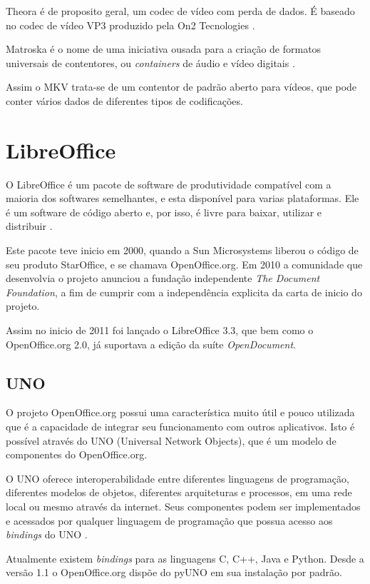Theora é de proposito geral, um codec de vídeo com perda de dados. É baseado no codec de vídeo VP3 produzido pela On2 Tecnologies \cite{XIPH-THEORA}.

Matroska é o nome de uma iniciativa ousada para a criação de formatos universais de contentores, ou \textit{containers} de áudio e vídeo digitais \cite{WIKIPEDIA-MATROSKA}.

Assim o MKV trata-se de um contentor de padrão aberto para vídeos, que pode conter vários dados de diferentes tipos de codificações.

\section{LibreOffice}

O LibreOffice é um pacote de software de produtividade compatível com a maioria dos softwares semelhantes, e esta disponível para varias plataformas. Ele é um software de código aberto e, por isso, é livre para baixar, utilizar e distribuir \cite{LibreOffice}.

Este pacote teve inicio em 2000, quando a Sun Microsystems liberou o código de seu produto StarOffice, e se chamava OpenOffice.org. Em 2010 a comunidade que desenvolvia o projeto anunciou a fundação independente \textit{The Document Foundation}, a fim de cumprir com a independência explicita da carta de inicio do projeto.

Assim no inicio de 2011 foi lançado o LibreOffice 3.3, que bem como o OpenOffice.org 2.0, já suportava a edição da suíte \textit{OpenDocument}.

\subsection{UNO}
\label{uno}

O projeto OpenOffice.org possui uma característica muito útil e pouco utilizada que é a capacidade de integrar seu funcionamento com outros aplicativos. Isto é possível através do UNO (Universal Network Objects), que é um modelo de componentes do OpenOffice.org.

O UNO oferece interoperabilidade entre diferentes linguagens de programação, diferentes modelos de objetos, diferentes arquiteturas e processos, em uma rede local ou mesmo através da internet. Seus componentes podem ser implementados e acessados por qualquer linguagem de programação que possua acesso aos \textit{bindings} do UNO \cite{MINETTO-PYUNO}.

Atualmente existem \textit{bindings} para as linguagens C, C++, Java e Python. Desde a versão 1.1 o OpenOffice.org dispõe do pyUNO em sua instalação por padrão.

